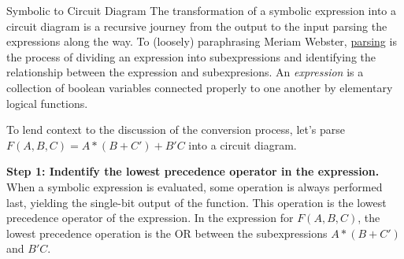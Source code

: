 \begin{process}{Symbolic to Circuit Diagram}
The transformation of a symbolic expression into a circuit diagram is a recursive journey
from the output to the input parsing the expressions along the
way.  To (loosely) paraphrasing Meriam Webster, 
\href{https://www.merriam-webster.com/dictionary/parse}{parsing} is the process
of dividing an expression into subexpressions and identifying the relationship
between the expression and subexpresions.  An \textit{expression}  is 
a collection of boolean variables connected properly to one another by 
elementary logical functions. 

To lend context to the discussion of the conversion process, let's parse
$F(A,B,C) = A*(B+C')+B'C$ into a circuit diagram.


\textbf{Step 1: Indentify the lowest precedence operator in the expression.}
When a symbolic expression is evaluated, some operation is always performed last, yielding
the single-bit output of the function.  This operation is the lowest 
precedence operator of the expression.  In the expression for $F(A,B,C)$,
 the lowest precedence operation is the
OR between the subexpressions $A*(B+C')$ and $B'C$. 


\end{process}
